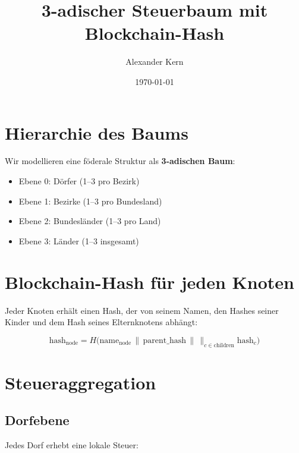 \documentclass[a4paper,12pt]{article}
\title{3-adischer Steuerbaum mit Blockchain-Hash}
\author{Alexander Kern}
\date{\today}
\begin{document}
\maketitle

\section{Hierarchie des Baums}
Wir modellieren eine föderale Struktur als \textbf{3-adischen Baum}:
\begin{itemize}
    \item Ebene 0: Dörfer (1--3 pro Bezirk)
    \item Ebene 1: Bezirke (1--3 pro Bundesland)
    \item Ebene 2: Bundesländer (1--3 pro Land)
    \item Ebene 3: Länder (1--3 insgesamt)
\end{itemize}

\begin{center}
\end{center}

\section{Blockchain-Hash für jeden Knoten}
Jeder Knoten erhält einen Hash, der von seinem Namen, den Hashes seiner Kinder und dem Hash seines Elternknotens abhängt:

\begin{equation}
\text{hash}_\text{node} = H\Big(\text{name}_\text{node} \,\|\, \text{parent\_hash} \,\|\, \big\|_{c \in \text{children}} \text{hash}_c \Big)
\end{equation}

\section{Steueraggregation}
\subsection{Dorfebene}
Jedes Dorf erhebt eine lokale Steuer:
\end{document}
